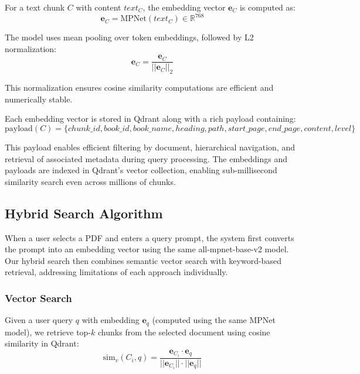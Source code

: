 \documentclass[runningheads]{llncs}
\begin{document}
For a text chunk $C$ with content $text_C$, the embedding vector $\mathbf{e}_C$ is computed as:
\begin{equation}
\mathbf{e}_C = \mathrm{MPNet}(text_C) \in \mathbb{R}^{768}
\end{equation}

The model uses mean pooling over token embeddings, followed by L2 normalization:
\begin{equation}
\mathbf{e}_C = \frac{\mathbf{e}_C}{||\mathbf{e}_C||_2}
\end{equation}

This normalization ensures cosine similarity computations are efficient and numerically stable.

Each embedding vector is stored in Qdrant along with a rich payload containing:
\begin{equation}
\mathrm{payload}(C) = \{chunk\_id, book\_id, book\_name, heading, path, start\_page, end\_page, content, level\}
\end{equation}

This payload enables efficient filtering by document, hierarchical navigation, and retrieval of associated metadata during query processing. The embeddings and payloads are indexed in Qdrant's vector collection, enabling sub-millisecond similarity search even across millions of chunks.

\subsection{Hybrid Search Algorithm}

When a user selects a PDF and enters a query prompt, the system first converts the prompt into an embedding vector using the same all-mpnet-base-v2 model. Our hybrid search then combines semantic vector search with keyword-based retrieval, addressing limitations of each approach individually.

\subsubsection{Vector Search}

Given a user query $q$ with embedding $\mathbf{e}_q$ (computed using the same MPNet model), we retrieve top-$k$ chunks from the selected document using cosine similarity in Qdrant:
\begin{equation}
\mathrm{sim}_v(C_i, q) = \frac{\mathbf{e}_{C_i} \cdot \mathbf{e}_q}{||\mathbf{e}_{C_i}|| \cdot ||\mathbf{e}_q||}
\end{equation}
\end{document}
